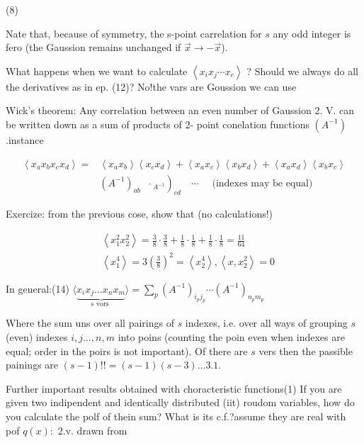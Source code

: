 (8)

Nate that, because of symmetry, the s-point carrelation for $s$ any odd integer is fero (the Gaussion remains unchanged if $\vec{x} \rightarrow-\vec{x}$). 

What happens when we want to calculate $\left\langle x_{i} x_{j} \cdots x_{e}\right\rangle$ ? Should we always do all the derivatives as in ep. (12)? No!\nof the vars are Goussion we can use

Wick's theorem: Any correlation between an even number of Gaussion 2. V. can be written down as a sum of products of 2- point conelation functions $\left(A^{-1}\right)$.\nFor instance

$$ 
\begin{aligned}
\left\langle x_{a} x_{b} x_{c} x_{d}\right\rangle= & \left\langle x_{a} x_{b}\right\rangle\left\langle x_{c} x_{d}\right\rangle+\left\langle x_{a} x_{c}\right\rangle\left\langle x_{b} x_{d}\right\rangle+\left\langle x_{a} x_{d}\right\rangle\left\langle x_{b} x_{c}\right\rangle \\
& \left.\left(A^{-1}\right)_{a b} \quad \hat{~}_{A^{-1}}\right)_{c d} \quad \cdots \quad \text { (indexes may be equal) }
\end{aligned}
$$ 

Exercize: from the previous cose, show that (no calculations!)

$$ 
\begin{aligned}
& \left\langle x_{1}^{2} x_{2}^{2}\right\rangle=\frac{3}{8} \cdot \frac{3}{8}+\frac{1}{8} \cdot \frac{1}{8}+\frac{1}{8} \cdot \frac{1}{8}=\frac{11}{64} \\
& \left\langle x_{1}^{4}\right\rangle=3\left(\frac{3}{8}\right)^{2}=\left\langle x_{2}^{4}\right\rangle,\left\langle x, x_{2}^{2}\right\rangle=0
\end{aligned}
$$ 

In general:\n(14) $\langle\underbrace{x_{i} x_{j} \ldots x_{n} x_{m}}_{s \text { vors }}\rangle=\sum_{p}\left(A^{-1}\right)_{i_{p} j_{p}} \cdots\left(A^{-1}\right)_{n_{p} m_{p}}$

Where the sum uns over all pairings of $s$ indexes, i.e. over all ways of grouping $s$ (even) indexes $i, j \ldots, n, m$ into poins (counting the poin even when indexes are equal; order in the poirs is not important). Of there are $s$ vers then the passible painings are $(s-1)!!=(s-1)(s-3) \ldots 3.1$.

Further important results obtained with choracteristic functions\n(1) If you are given two indipendent and identically distributed (iit) roudom variables, how do you calculate the polf of thein sum? What is its c.f.?\nWe assume they are real with pof $q(x) :$ \n2.v. drawn from

